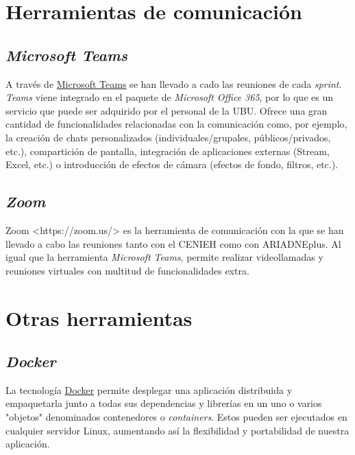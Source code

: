 \documentclass[
]{article}
\begin{document}
\hypertarget{herramientas-de-comunicaciuxf3n}{%
\section{Herramientas de
comunicación}\label{herramientas-de-comunicaciuxf3n}}

\hypertarget{microsoft-teams}{%
\subsection{\texorpdfstring{\emph{Microsoft
Teams}}{Microsoft Teams}}\label{microsoft-teams}}

A través de
\href{https://www.microsoft.com/es-es/education/products/teams}{Microsoft
Teams} se han llevado a cado las reuniones de cada \emph{sprint}.
\emph{Teams} viene integrado en el paquete de \emph{Microsoft Office
365}, por lo que es un servicio que puede ser adquirido por el personal
de la UBU. Ofrece una gran cantidad de funcionalidades relacionadas con
la comunicación como, por ejemplo, la creación de chats personalizados
(individuales/grupales, públicos/privados, etc.), compartición de
pantalla, integración de aplicaciones externas (Stream, Excel, etc.) o
introducción de efectos de cámara (efectos de fondo, filtros, etc.).

\hypertarget{zoom}{%
\subsection{\texorpdfstring{\emph{Zoom}}{Zoom}}\label{zoom}}

{Zoom \textless https://zoom.us/\textgreater{}} es la herramienta de
comunicación con la que se han llevado a cabo las reuniones tanto con el
CENIEH como con ARIADNEplus. Al igual que la herramienta \emph{Microsoft
Teams}, permite realizar videollamadas y reuniones virtuales con
multitud de funcionalidades extra.

\hypertarget{otras-herramientas}{%
\section{Otras herramientas}\label{otras-herramientas}}

\hypertarget{docker}{%
\subsection{\texorpdfstring{\emph{Docker}}{Docker}}\label{docker}}

La tecnología \href{https://www.docker.com/}{Docker} permite desplegar
una aplicación distribuida y empaquetarla junto a todas sus dependencias
y librerías en un uno o varios "objetos" denominados contenedores o
\emph{containers}. Estos pueden ser ejecutados en cualquier servidor
Linux, aumentando así la flexibilidad y portabilidad de nuestra
aplicación.
\end{document}
